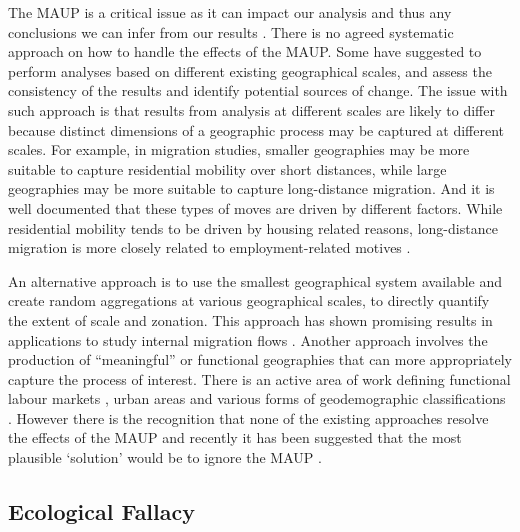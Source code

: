 \documentclass[
]{book}
\begin{document}
The MAUP is a critical issue as it can impact our analysis and thus any conclusions we can infer from our results \citep[e.g.~][]{fotheringham1991modifiable}. There is no agreed systematic approach on how to handle the effects of the MAUP. Some have suggested to perform analyses based on different existing geographical scales, and assess the consistency of the results and identify potential sources of change. The issue with such approach is that results from analysis at different scales are likely to differ because distinct dimensions of a geographic process may be captured at different scales. For example, in migration studies, smaller geographies may be more suitable to capture residential mobility over short distances, while large geographies may be more suitable to capture long-distance migration. And it is well documented that these types of moves are driven by different factors. While residential mobility tends to be driven by housing related reasons, long-distance migration is more closely related to employment-related motives \citep{niedomysl2011migration}.

An alternative approach is to use the smallest geographical system available and create random aggregations at various geographical scales, to directly quantify the extent of scale and zonation. This approach has shown promising results in applications to study internal migration flows \citep{stillwell2018spatial}. Another approach involves the production of ``meaningful'' or functional geographies that can more appropriately capture the process of interest. There is an active area of work defining functional labour markets \citep{casado2017evolutionary}, urban areas \citep{arribas2019building} and various forms of geodemographic classifications \citep{singleton2014past, patias2019scalable}. However there is the recognition that none of the existing approaches resolve the effects of the MAUP and recently it has been suggested that the most plausible `solution' would be to ignore the MAUP \citep{wolf2020quantitative}.

\hypertarget{ecological-fallacy}{%
\subsection{Ecological Fallacy}\label{ecological-fallacy}}
\end{document}
